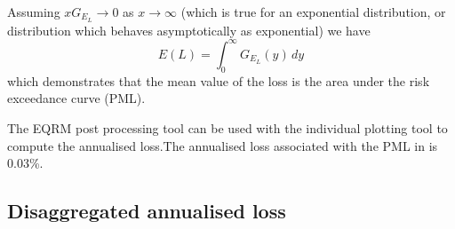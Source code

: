 Assuming $xG_{E_L}\to 0$ as $x\to\infty$ (which is true for an
exponential distribution, or distribution which behaves
asymptotically as exponential) we have
$$
 E(L) = \int_0^\infty G_{E_L}(y)\,dy
$$
which demonstrates that the mean value of the loss is the area
under the risk exceedance curve (PML).

The EQRM post processing tool  can
be used with the individual plotting tool
 to compute the annualised loss.The
annualised loss associated with the PML in  is
0.03\%.

\subsection{Disaggregated annualised loss}

